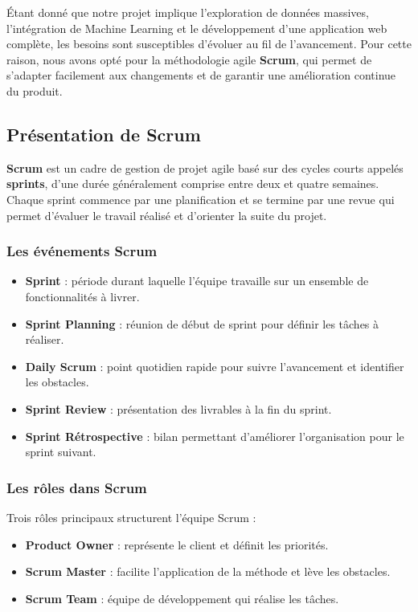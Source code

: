 \documentclass[12pt, oneside, a4paper]{report}
\begin{document}
Étant donné que notre projet implique l'exploration de données massives, l'intégration de Machine Learning et le développement d'une application web complète, les besoins sont susceptibles d'évoluer au fil de l'avancement. Pour cette raison, nous avons opté pour la méthodologie agile \textbf{Scrum}, qui permet de s'adapter facilement aux changements et de garantir une amélioration continue du produit.

\subsection{Présentation de Scrum}
\textbf{Scrum} est un cadre de gestion de projet agile basé sur des cycles courts appelés \textbf{sprints}, d'une durée généralement comprise entre deux et quatre semaines. Chaque sprint commence par une planification et se termine par une revue qui permet d'évaluer le travail réalisé et d'orienter la suite du projet.

\subsubsection{Les événements Scrum}
\begin{itemize}
    \item \textbf{Sprint} : période durant laquelle l'équipe travaille sur un ensemble de fonctionnalités à livrer.
    \item \textbf{Sprint Planning} : réunion de début de sprint pour définir les tâches à réaliser.
    \item \textbf{Daily Scrum} : point quotidien rapide pour suivre l'avancement et identifier les obstacles.
    \item \textbf{Sprint Review} : présentation des livrables à la fin du sprint.
    \item \textbf{Sprint Rétrospective} : bilan permettant d'améliorer l'organisation pour le sprint suivant.
\end{itemize}

\subsubsection{Les rôles dans Scrum}
Trois rôles principaux structurent l'équipe Scrum :
\begin{itemize}
    \item \textbf{Product Owner} : représente le client et définit les priorités.
    \item \textbf{Scrum Master} : facilite l'application de la méthode et lève les obstacles.
    \item \textbf{Scrum Team} : équipe de développement qui réalise les tâches.
\end{itemize}
\end{document}
